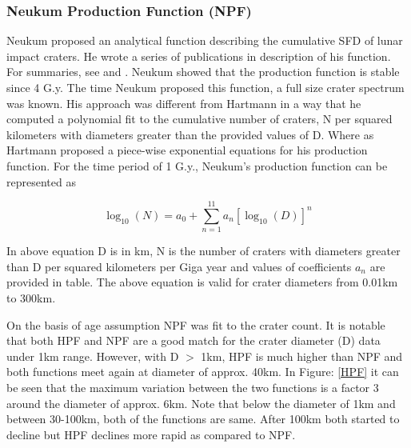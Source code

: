 \documentclass[11pt]{article}
\begin{document}
\subsubsection{Neukum Production Function (NPF)}
Neukum proposed an analytical function describing the cumulative SFD of lunar impact craters. He wrote a series of publications in description of his function. For summaries, see \cite{neukum1994crater} and \cite{neukum1983meteoritenbombardement}. Neukum showed that the production function is stable since 4 G.y. The time Neukum proposed this function, a full size crater spectrum was known. His approach was different from Hartmann in a way that he computed a polynomial fit to the cumulative number of craters, N per squared kilometers with diameters greater than the provided values of D. Where as Hartmann proposed a piece-wise exponential equations for his production function. For the time period of 1 G.y., Neukum's production function can be represented as

\begin{equation}
\log_{10} (N) = a_0 + \sum_{n=1}^{11} a_n[\log_{10} (D)]^n
\end{equation}

In above equation D is in km, N is the number of craters with diameters greater than D per squared kilometers per Giga year and values of coefficients $a_n$ are provided in table. The above equation is valid for crater diameters from 0.01km to 300km.

On the basis of age assumption NPF was fit to the crater count. It is notable that both HPF and NPF are a good match for the crater diameter (D) data under 1km range. However, with D $>$ 1km, HPF is much higher than NPF and both functions meet again at diameter of approx. 40km. In Figure: \ref{HPF} it can be seen that the maximum variation between the two functions is a factor 3 around the diameter of approx. 6km. Note that below the diameter of 1km and between 30-100km, both of the functions are same. After 100km both started to decline but HPF declines more rapid as compared to NPF.
\end{document}
